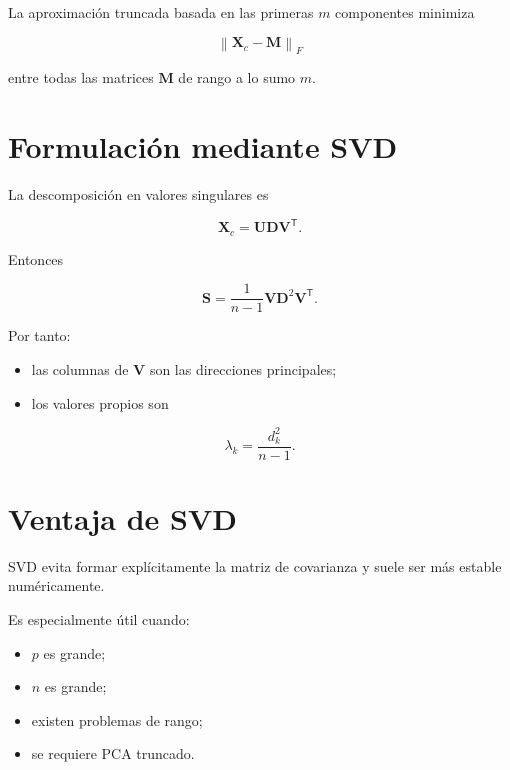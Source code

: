 \documentclass[
  spanish,
  10.5pt,
  letterpaper,
  DIV=11,
  numbers=noendperiod,
  oneside,
  open=any]{scrreprt}
\providecommand{\tightlist}{%
  \setlength{\itemsep}{0pt}\setlength{\parskip}{0pt}}
\theoremstyle{definition}
\theoremstyle{definition}
\theoremstyle{plain}
\theoremstyle{remark}
\begin{document}

La aproximación truncada basada en las primeras \(m\) componentes
minimiza

\[
\left\|
\mathbf{X}_c
-
\mathbf{M}
\right\|_F
\]

entre todas las matrices \(\mathbf{M}\) de rango a lo sumo \(m\).

\section*{Formulación mediante SVD}\label{formulaciuxf3n-mediante-svd}


La descomposición en valores singulares es

\[
\mathbf{X}_c
=
\mathbf{U}
\mathbf{D}
\mathbf{V}^{\mathsf T}.
\]

Entonces

\[
\mathbf{S}
=
\frac{1}{n-1}
\mathbf{V}
\mathbf{D}^2
\mathbf{V}^{\mathsf T}.
\]

Por tanto:

\begin{itemize}
\tightlist
\item
  las columnas de \(\mathbf{V}\) son las direcciones principales;
\item
  los valores propios son
\end{itemize}

\[
\lambda_k
=
\frac{d_k^2}{n-1}.
\]

\section*{Ventaja de SVD}\label{ventaja-de-svd}


SVD evita formar explícitamente la matriz de covarianza y suele ser más
estable numéricamente.

Es especialmente útil cuando:

\begin{itemize}
\tightlist
\item
  \(p\) es grande;
\item
  \(n\) es grande;
\item
  existen problemas de rango;
\item
  se requiere PCA truncado.
\end{itemize}
\end{document}
